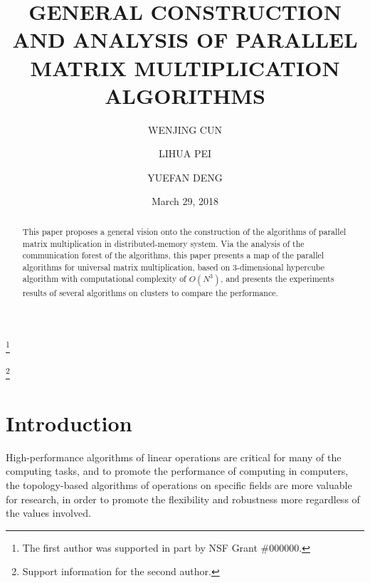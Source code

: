 \documentclass{amsart}
\theoremstyle{definition}
\theoremstyle{remark}
\numberwithin{equation}{section}
\begin{document}
\title{GENERAL CONSTRUCTION AND ANALYSIS OF PARALLEL MATRIX MULTIPLICATION ALGORITHMS}

\author{WENJING CUN}
\address{Department of Applied Mathematics, Stonybrook Univ. SUNY, 
Stony Brook, New York 11790}
\thanks{The first author was supported in part by NSF Grant \#000000.}

\author{LIHUA PEI}
\address{Department of Applied Mathematics, Stonybrook Univ. SUNY, 
Stony Brook, New York 11790}
\thanks{Support information for the second author.}

\author{YUEFAN DENG}
\address{Department of Applied Mathematics, Stonybrook Univ. SUNY, 
Stony Brook, New York 11790}


\date{March 29, 2018}

\begin{abstract}
	This paper proposes a general vision onto the construction of the algorithms of parallel matrix multiplication in distributed-memory system. Via the analysis of the communication forest of the algorithms, this paper presents a map of the parallel algorithms for universal matrix multiplication, based on 3-dimensional hypercube algorithm with computational complexity of $O(N^3)$, and presents the experiments results of several algorithms on clusters to compare the performance.
\end{abstract}
\maketitle
\section{Introduction}
	High-performance algorithms of linear operations are critical for many of the computing tasks, and to promote the performance of computing in computers, the topology-based algorithms of operations on specific fields are more valuable for research, in order to promote the flexibility and robustness more regardless of the values involved.\par
\end{document}
